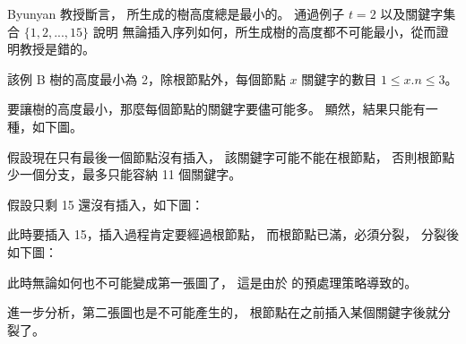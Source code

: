 \startEXERCISE
Byunyan 教授斷言，  所生成的樹高度總是最小的。
通過例子 $t=2$ 以及關鍵字集合 $\{1,2,...,15\}$ 說明
無論插入序列如何，所生成樹的高度都不可能最小，從而證明教授是錯的。
\stopEXERCISE

\startANSWER
該例 B 樹的高度最小為 2，除根節點外，每個節點 $x$ 關鍵字的數目 $1\le x.n\le 3$。

要讓樹的高度最小，那麼每個節點的關鍵字要儘可能多。
顯然，結果只能有一種，如下圖。

{\externalfigure[output/e18_2-3-1]}{}

假設現在只有最後一個節點沒有插入，
該關鍵字可能不能在根節點，
否則根節點少一個分支，最多只能容納 11 個關鍵字。

假設只剩 15 還沒有插入，如下圖：

{\externalfigure[output/e18_2-3-2]}{}

此時要插入 15，插入過程肯定要經過根節點，
而根節點已滿，必須分裂，
分裂後如下圖：

{\externalfigure[output/e18_2-3-3]}{}
此時無論如何也不可能變成第一張圖了，
這是由於  的預處理策略導致的。

進一步分析，第二張圖也是不可能產生的，
根節點在之前插入某個關鍵字後就分裂了。
\stopANSWER
